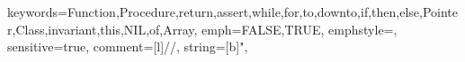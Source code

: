 {keywords={Function,Procedure,return,assert,while,for,to,downto,if,then,else,Pointer,Class,invariant,this,NIL,of,Array},%
emph={FALSE,TRUE},
emphstyle=\color{colconst},
sensitive=true,%
comment=[l]{//},%
string=[b]",%
}
